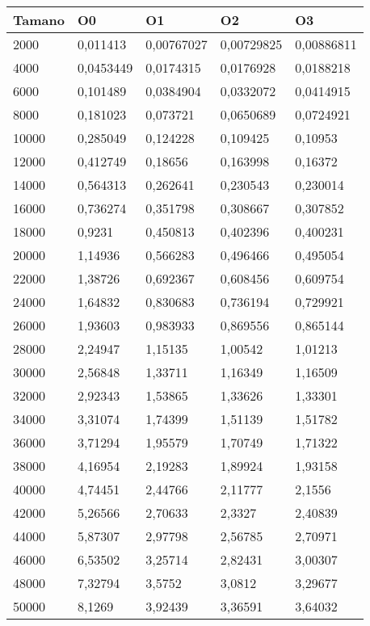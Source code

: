 \begin{tabular}{|l|l|l|l|l|}
	\hline
	Tamano & O0 & O1 & O2 & O3 \\
	\hline
	\hline
	2000 & 0,011413 & 0,00767027 & 0,00729825 & 0,00886811 \\
	\hline
	4000 & 0,0453449 & 0,0174315 & 0,0176928 & 0,0188218 \\
	\hline
	6000 & 0,101489 & 0,0384904 & 0,0332072 & 0,0414915 \\
	\hline
	8000 & 0,181023 & 0,073721 & 0,0650689 & 0,0724921 \\
	\hline
	10000 & 0,285049 & 0,124228 & 0,109425 & 0,10953 \\
	\hline
	12000 & 0,412749 & 0,18656 & 0,163998 & 0,16372 \\
	\hline
	14000 & 0,564313 & 0,262641 & 0,230543 & 0,230014 \\
	\hline
	16000 & 0,736274 & 0,351798 & 0,308667 & 0,307852 \\
	\hline
	18000 & 0,9231 & 0,450813 & 0,402396 & 0,400231 \\
	\hline
	20000 & 1,14936 & 0,566283 & 0,496466 & 0,495054 \\
	\hline
	22000 & 1,38726 & 0,692367 & 0,608456 & 0,609754 \\
	\hline
	24000 & 1,64832 & 0,830683 & 0,736194 & 0,729921 \\
	\hline
	26000 & 1,93603 & 0,983933 & 0,869556 & 0,865144 \\
	\hline
	28000 & 2,24947 & 1,15135 & 1,00542 & 1,01213 \\
	\hline
	30000 & 2,56848 & 1,33711 & 1,16349 & 1,16509 \\
	\hline
	32000 & 2,92343 & 1,53865 & 1,33626 & 1,33301 \\
	\hline
	34000 & 3,31074 & 1,74399 & 1,51139 & 1,51782 \\
	\hline
	36000 & 3,71294 & 1,95579 & 1,70749 & 1,71322 \\
	\hline
	38000 & 4,16954 & 2,19283 & 1,89924 & 1,93158 \\
	\hline
	40000 & 4,74451 & 2,44766 & 2,11777 & 2,1556 \\
	\hline
	42000 & 5,26566 & 2,70633 & 2,3327 & 2,40839 \\
	\hline
	44000 & 5,87307 & 2,97798 & 2,56785 & 2,70971 \\
	\hline
	46000 & 6,53502 & 3,25714 & 2,82431 & 3,00307 \\
	\hline
	48000 & 7,32794 & 3,5752 & 3,0812 & 3,29677 \\
	\hline
	50000 & 8,1269 & 3,92439 & 3,36591 & 3,64032 \\
	\hline
\end{tabular}
